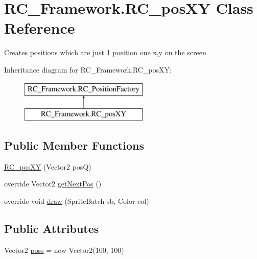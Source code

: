 \hypertarget{class_r_c___framework_1_1_r_c__pos_x_y}{}\section{R\+C\+\_\+\+Framework.\+R\+C\+\_\+pos\+XY Class Reference}
\label{class_r_c___framework_1_1_r_c__pos_x_y}


Creates positions which are just 1 position one x,y on the screen  


Inheritance diagram for R\+C\+\_\+\+Framework.\+R\+C\+\_\+pos\+XY\+:\begin{figure}[H]
\begin{center}
\leavevmode
\includegraphics[height=2.000000cm]{class_r_c___framework_1_1_r_c__pos_x_y}
\end{center}
\end{figure}
\subsection*{Public Member Functions}
\begin{DoxyCompactItemize}
\item 
\mbox{\hyperlink{class_r_c___framework_1_1_r_c__pos_x_y_a27e517ab746a80cfaef66091813ad3ab}{R\+C\+\_\+pos\+XY}} (Vector2 posQ)
\item 
override Vector2 \mbox{\hyperlink{class_r_c___framework_1_1_r_c__pos_x_y_a773d0a5b2b6bfc49510dbecdfbf1f9cc}{get\+Next\+Pos}} ()
\item 
override void \mbox{\hyperlink{class_r_c___framework_1_1_r_c__pos_x_y_aaf344770b6a98b98937f4d43ffd536ef}{draw}} (Sprite\+Batch sb, Color col)
\end{DoxyCompactItemize}
\subsection*{Public Attributes}
\begin{DoxyCompactItemize}
\item 
Vector2 \mbox{\hyperlink{class_r_c___framework_1_1_r_c__pos_x_y_a4774a0f0a72a2c7bc38431e95df70b98}{poss}} = new Vector2(100, 100)
\end{DoxyCompactItemize}


